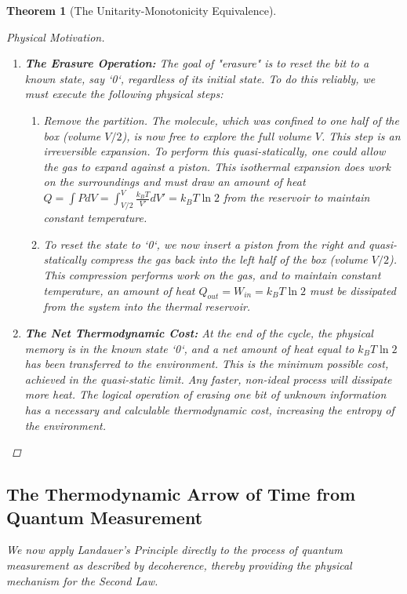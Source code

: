 \documentclass[11pt, letterpaper]{report}
\theoremstyle{plain} %
\newtheorem{theorem}{Theorem}[chapter]
\theoremstyle{definition} %
\theoremstyle{remark} %
\begin{document}
\begin{theorem}[The Unitarity-Monotonicity Equivalence]
\begin{proof}[Physical Motivation]
\begin{enumerate}
    \item \textbf{The Erasure Operation:} The goal of "erasure" is to reset the bit to a known state, say `0`, regardless of its initial state. To do this reliably, we must execute the following physical steps:
    \begin{enumerate}
        \item Remove the partition. The molecule, which was confined to one half of the box (volume $V/2$), is now free to explore the full volume $V$. This step is an irreversible expansion. To perform this quasi-statically, one could allow the gas to expand against a piston. This isothermal expansion does work on the surroundings and must draw an amount of heat $Q = \int P dV = \int_{V/2}^V \frac{k_B T}{V'} dV' = k_B T \ln 2$ from the reservoir to maintain constant temperature.
        \item To reset the state to `0`, we now insert a piston from the right and quasi-statically compress the gas back into the left half of the box (volume $V/2$). This compression performs work on the gas, and to maintain constant temperature, an amount of heat $Q_{out} = W_{in} = k_B T \ln 2$ must be dissipated from the system into the thermal reservoir.
    \end{enumerate}
    \item \textbf{The Net Thermodynamic Cost:} At the end of the cycle, the physical memory is in the known state `0`, and a net amount of heat equal to $k_B T \ln 2$ has been transferred to the environment. This is the minimum possible cost, achieved in the quasi-static limit. Any faster, non-ideal process will dissipate more heat. The logical operation of erasing one bit of unknown information has a necessary and calculable thermodynamic cost, increasing the entropy of the environment.
\end{enumerate}
\end{proof}

\subsection{The Thermodynamic Arrow of Time from Quantum Measurement}
We now apply Landauer's Principle directly to the process of quantum measurement as described by decoherence, thereby providing the physical mechanism for the Second Law.


\end{theorem}
\end{document}
